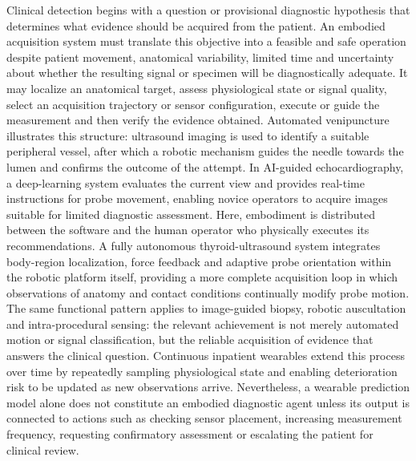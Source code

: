 \documentclass[12pt,a4paper]{article}
\begin{document}
Clinical detection begins with a question or provisional diagnostic hypothesis that determines what evidence should be acquired from the patient. An embodied acquisition system must translate this objective into a feasible and safe operation despite patient movement, anatomical variability, limited time and uncertainty about whether the resulting signal or specimen will be diagnostically adequate. It may localize an anatomical target, assess physiological state or signal quality, select an acquisition trajectory or sensor configuration, execute or guide the measurement and then verify the evidence obtained. Automated venipuncture illustrates this structure: ultrasound imaging is used to identify a suitable peripheral vessel, after which a robotic mechanism guides the needle towards the lumen and confirms the outcome of the attempt. In AI-guided echocardiography, a deep-learning system evaluates the current view and provides real-time instructions for probe movement, enabling novice operators to acquire images suitable for limited diagnostic assessment. Here, embodiment is distributed between the software and the human operator who physically executes its recommendations. A fully autonomous thyroid-ultrasound system integrates body-region localization, force feedback and adaptive probe orientation within the robotic platform itself, providing a more complete acquisition loop in which observations of anatomy and contact conditions continually modify probe motion. The same functional pattern applies to image-guided biopsy, robotic auscultation and intra-procedural sensing: the relevant achievement is not merely automated motion or signal classification, but the reliable acquisition of evidence that answers the clinical question. Continuous inpatient wearables extend this process over time by repeatedly sampling physiological state and enabling deterioration risk to be updated as new observations arrive. Nevertheless, a wearable prediction model alone does not constitute an embodied diagnostic agent unless its output is connected to actions such as checking sensor placement, increasing measurement frequency, requesting confirmatory assessment or escalating the patient for clinical review.
\end{document}
